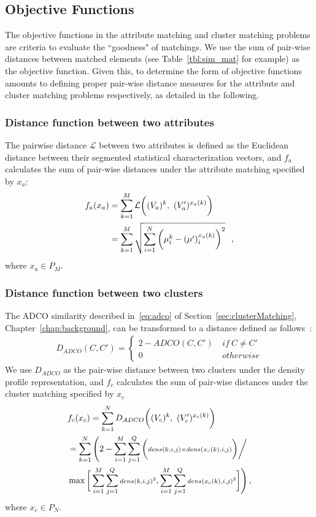 \subsection{Objective Functions}
\label{sec:obj_funcs}
The objective functions in the attribute matching and cluster matching problems are criteria to evaluate the ``goodness" of matchings. We use the sum of pair-wise distances between matched elements (see Table~\ref{tbl:sim_mat} for example) as the objective function. Given this, to determine the form of objective functions amounts to defining proper pair-wise distance measures for the attribute and cluster matching problems respectively, as detailed in the following.


\subsubsection{Distance function between two attributes}
The pairwise distance $\mathcal{L}$ between two attributes is defined as the Euclidean distance between their segmented statistical characterization vectors, and $f_a$ calculates the sum of pair-wise distances under the attribute matching specified by $x_a$:
\begin{align}
\notag f_a(x_a)&=\sum_{k=1}^M\mathcal{L}\bigg((V_a)^k,~(V_a')^{x_a(k)}\bigg)\\
&=\sum_{k=1}^M\sqrt{\sum_{i=1}^N\bigg(\mu^{k}_i-(\mu')^{x_a(k)}_i\bigg)^2} \label{eq:calc_L_mm} ~~ ,
\end{align}
where $x_a \in P_M$.

\subsubsection{Distance function between two clusters}

The ADCO similarity described in~\ref{eq:adco} of Section~\ref{sec:clusterMatching}, Chapter~\ref{chap:background}, can be transformed to a distance defined as follows~\cite{Bae2010}:
\begin{align}
D_{ADCO}(C,C')=\left\{\begin{array}{ll}
	   { 2-ADCO(C,C')} & { ~if~ C \neq C'}\\
	   { 0} & ~{ otherwise}
	   \end{array}\right.
\end{align}
We use $D_{ADCO}$ as the pair-wise distance between two clusters under the density profile representation, and $f_c$ calculates the sum of pair-wise distances under the cluster matching specified by $x_c$
\begin{align}
\notag &f_c(x_c)=\sum_{k=1}^N D_{ADCO} \bigg((V_c)^k,~(V_c')^{x_c(k)}\bigg)\\
\notag &=\sum_{k=1}^N\Bigg(2- \sum_{i=1}^M\sum_{j=1}^Q\bigg({\scriptstyle dens(k,i,j)\times dens(x_c(k),i,j)\bigg) \bigg/ }\\ &\max{\bigg[\sum_{i=1}^M\sum_{j=1}^Q {\scriptstyle dens(k,i,j)^2},\sum_{i=1}^M\sum_{j=1}^Q {\scriptstyle dens(x_c(k),i,j)^2}\bigg]}\Bigg) \label{eq:calc_L_mm} \, ,
\end{align}
where $x_c \in P_N$.

